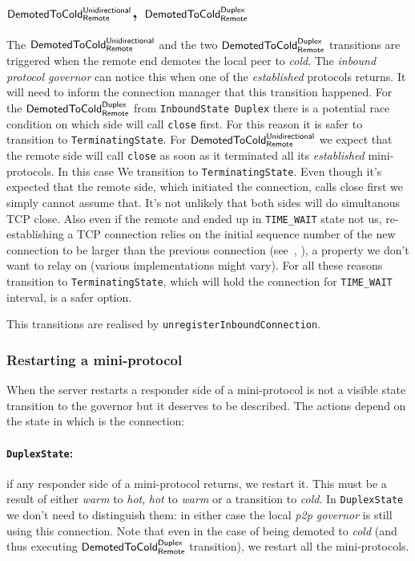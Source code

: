\documentclass{article}
\def\TCP{\textsf{TCP}}
\def\DuplexState{\texttt{DuplexState}}
\def\InboundStateDup{\texttt{InboundState Duplex}}
\def\TerminatingState{\texttt{TerminatingState}}
\def\DemotedToColdDupRem{$\text{\textsf{DemotedToCold}}^\text{\textsf{Duplex}}_\text{\textsf{Remote}}$}
\def\DemotedToColdUniRem{$\text{\textsf{DemotedToCold}}^\text{\textsf{Unidirectional}}_\text{\textsf{Remote}}$}
\def\cold{\textit{cold}}
\def\warm{\textit{warm}}
\def\hot{\textit{hot}}
\def\established{\textit{established}}
\def\ptopgov{\textit{p2p governor}}
\def\inbgov{\textit{inbound protocol governor}}
\begin{document}
\subsection{\DemotedToColdUniRem{}, \DemotedToColdDupRem{}}
The \DemotedToColdUniRem{} and the two \DemotedToColdDupRem{} transitions are triggered
when the remote end demotes the local peer to \cold{}.  The \inbgov{} can
notice this when one of the \established{} protocols returns.  It will need to
inform the connection manager that this transition happened.  For the
\DemotedToColdDupRem{} from \InboundStateDup{} there is a potential race
condition on which side will call \texttt{close} first.  For this reason it is
safer to transition to \TerminatingState{}.  For \DemotedToColdUniRem{} we
expect that the remote side will call \texttt{close} as soon as it terminated
all its \established{} mini-protocols.  In this case We transition to
\TerminatingState{}.  Even though it's expected that the remote side, which
initiated the connection, calls close first we simply cannot assume
that.  It's not unlikely that both sides will do simultanous \TCP{} close.
Also even if the remote and ended up in \texttt{TIME\_WAIT} state not us,
re-establishing a \TCP{} connection relies on the initial sequence number of
the new connection to be larger than the previous connection (see~\cite[Chapter
2, \texttt{TIME\_WAIT} section]{stevens2003unix}, \cite[Section
4.2.2.13]{RFC1122}), a property we don't want to relay on (various
implementations might vary). For all these reasons transition to
\TerminatingState{,} which will hold the connection for \texttt{TIME\_WAIT}
interval, is a safer option.

This transitions are realised by \texttt{unregisterInboundConnection}.

\subsubsection{Restarting a mini-protocol}
When the server restarts a responder side of a mini-protocol is not a visible
state transition to the governor but it deserves to be described.  The actions
depend on the state in which is the connection:

\paragraph{\DuplexState{}:}
if any responder side of a mini-protocol returns, we
restart it.  This must be a result of either \warm{} to \hot{}, \hot{} to
\warm{} or a transition to \cold{}.  In \DuplexState{} we don't need to
distinguish them: in either case the local \ptopgov{} is still using this
connection.  Note that even in the case of being demoted to \cold{} (and thus
executing \DemotedToColdDupRem{} transition), we restart all the
mini-protocols.
\end{document}
